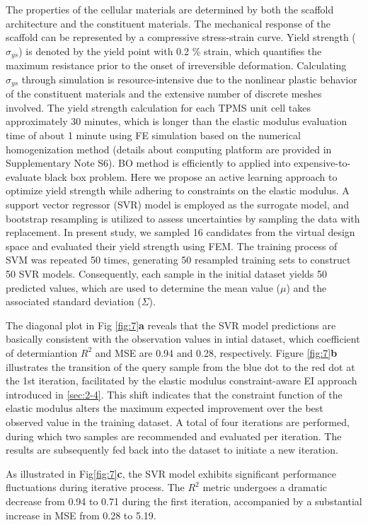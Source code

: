 \documentclass[preprint,review,12pt,authoryear]{elsarticle}
\begin{document}
The properties of the cellular materials are determined by both the scaffold architecture and the constituent materials. The mechanical response of the scaffold can be represented by a compressive stress-strain curve. Yield strength ($\sigma_{ys}$) is denoted by the yield point with 0.2 \% strain, which quantifies the maximum resistance prior to the onset of irreversible deformation. Calculating $\sigma_{ys}$ through simulation is resource-intensive due to the nonlinear plastic behavior of the constituent materials and the extensive number of discrete meshes involved. The yield strength calculation for each TPMS unit cell takes approximately 30 minutes, which is longer than the elastic modulus evaluation time of about 1 minute using FE simulation based on the numerical homogenization method (details about computing platform are provided in Supplementary Note S6). BO method is efficiently to applied into expensive-to-evaluate black box problem. Here we propose an active learning approach to optimize yield strength while adhering to constraints on the elastic modulus. A support vector regressor (SVR) model is employed as the surrogate model, and bootstrap resampling is utilized to assess uncertainties by sampling the data with replacement. In present study, we sampled 16 candidates from the virtual design space and evaluated their yield strength using FEM. The training process of SVM was repeated 50 times, generating 50 resampled training sets to construct 50 SVR models. Consequently, each sample in the initial dataset yields 50 predicted values, which are used to determine the mean value ($\mu$) and the associated standard deviation ($\Sigma$).


The diagonal plot in Fig \ref{fig:7}\textbf{a} reveals that the SVR model predictions are basically consistent with the observation values in intial dataset, which coefficient of determiantion $R^2$ and MSE are 0.94 and 0.28, respectively. Figure \ref{fig:7}\textbf{b }illustrates the transition of the query sample from the blue dot to the red dot at the 1st iteration, facilitated by the elastic modulus constraint-aware EI approach introduced in \ref{sec:2-4}. This shift indicates that the constraint function of the elastic modulus alters the maximum expected improvement over the best observed value in the training dataset. A total of four iterations are performed, during which two samples are recommended and evaluated per iteration. The results are subsequently fed back into the dataset to initiate a new iteration.

As illustrated in Fig\ref{fig:7}\textbf{c}, the SVR model exhibits significant performance fluctuations during iterative process. The $R^2$ metric undergoes a dramatic decrease from 0.94 to 0.71 during the first iteration, accompanied by a substantial increase in MSE from 0.28 to 5.19. 
\end{document}
